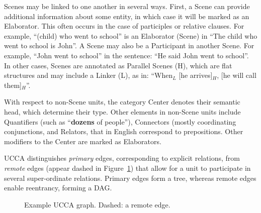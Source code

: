 \documentclass[11pt,a4paper]{article}
\begin{document}
  Scenes may be linked to one another in several ways. First, a Scene can provide additional information about some entity,
  in which case it will be marked as an Elaborator. This often occurs in the case of participles or relative clauses.
  For example, ``(child) who went to school'' is an Elaborator (Scene)
  in ``The child who went to school is John''.
  A Scene may also be a Participant in another Scene. For example, ``John went to school'' in the sentence: ``He said John went to school''. 
  In other cases, Scenes are annotated as Parallel Scenes (H), which are flat structures and may include a Linker (L), 
  as in:  ``When$_L$ [he arrives]$_H$, [he will call them]$_H$''.

  With respect to non-Scene units, the category Center denotes their semantic head, which determine their type. 
  Other elements in non-Scene units include Quantifiers (such as ``{\bf dozens} of people''), Connectors (mostly
  coordinating conjunctions, and Relators, that in English correspond to prepositions.
  Other modifiers to the Center are marked as Elaborators.
  
  UCCA distinguishes \textit{primary} edges, corresponding 
  to explicit relations, from \textit{remote} edges (appear dashed in
  Figure~\ref{fig:example_ucca}) that allow for a unit to participate
  in several super-ordinate relations.
  Primary edges form a tree, whereas remote edges enable reentrancy, forming a DAG.

\begin{figure}[th]
  \centering
\caption{\label{fig:example_ucca}
 Example UCCA graph. Dashed: a remote edge.}
\end{figure}
\end{document}
